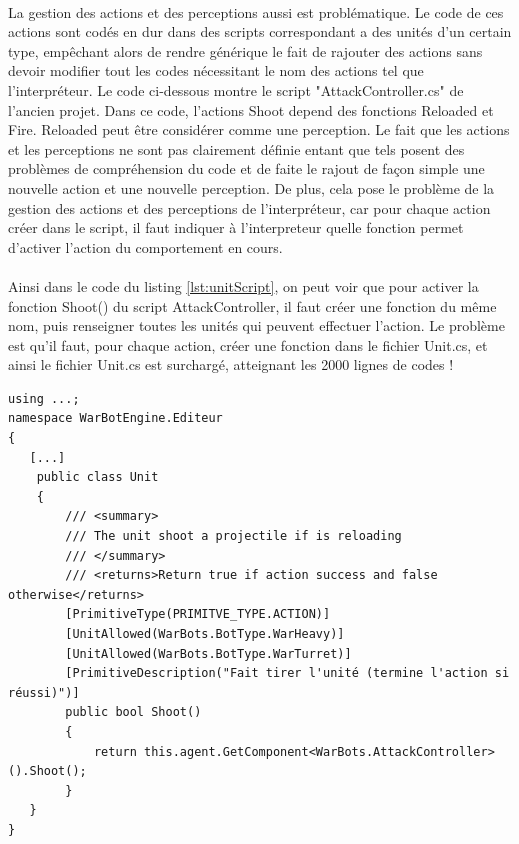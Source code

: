 \documentclass{report}
\begin{document}
\paragraph{} La gestion des actions et des perceptions aussi est problématique. Le code de ces actions sont codés en dur dans des scripts correspondant a des unités d'un certain type, empêchant alors de rendre générique le fait de rajouter des actions sans devoir modifier tout les codes nécessitant le nom des actions tel que l’interpréteur. Le code ci-dessous montre le script "AttackController.cs" de l'ancien projet. Dans ce code, l'actions Shoot depend des fonctions Reloaded et Fire. Reloaded peut être considérer comme une perception. Le fait que les actions et les perceptions ne sont pas clairement définie entant que tels posent des problèmes de compréhension du code et de faite le rajout de façon simple une nouvelle action et une nouvelle perception. De plus, cela pose le problème de la gestion des actions et des perceptions de l’interpréteur, car pour chaque action créer dans le script, il faut indiquer à l'interpreteur quelle fonction permet d'activer l'action du comportement en cours. 
\paragraph{}Ainsi dans le code du listing \ref{lst:unitScript}, on peut voir que pour activer la fonction Shoot() du script AttackController, il faut créer une fonction du même nom, puis renseigner toutes les unités qui peuvent effectuer l'action. Le problème est qu'il faut, pour chaque action, créer une fonction dans le fichier Unit.cs, et ainsi le fichier Unit.cs est surchargé, atteignant les 2000 lignes de codes !

\begin{lstlisting}[language={[Sharp]C},label={lst:unitScript}, caption=  Extrait du code du script Unit.cs]
using ...;
namespace WarBotEngine.Editeur
{
   [...]
	public class Unit
    {
        /// <summary>
        /// The unit shoot a projectile if is reloading
        /// </summary>
        /// <returns>Return true if action success and false otherwise</returns>
        [PrimitiveType(PRIMITVE_TYPE.ACTION)]
        [UnitAllowed(WarBots.BotType.WarHeavy)]
        [UnitAllowed(WarBots.BotType.WarTurret)]
        [PrimitiveDescription("Fait tirer l'unité (termine l'action si réussi)")]
        public bool Shoot()
        {
            return this.agent.GetComponent<WarBots.AttackController>().Shoot();
        }
   }
}

\end{lstlisting}
\end{document}
